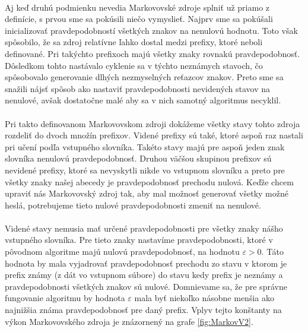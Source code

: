 \paragraph{}
Aj keď druhú podmienku nevedia Markovovské zdroje splniť už priamo z definície, s prvou sme sa pokúsili niečo vymyslieť. Najprv sme sa pokúšali inicializovať pravdepodobností všetkých znakov na nenulovú hodnotu. Toto však spôsobilo, že sa zdroj relatívne ľahko dostal medzi prefixy, ktoré neboli definované. Pri takýchto prefixoch majú všetky znaky rovnakú pravdepodobnosť. Dôsledkom tohto nastávalo cyklenie sa v týchto neznámych stavoch, čo spôsobovalo generovanie dlhých nezmyselných reťazcov znakov. Preto sme sa snažili nájsť spôsob ako nastaviť pravdepodobnosti nevidených stavov na nenulové, avšak dostatočne malé aby sa v nich samotný algoritmus necyklil.

\paragraph{}
Pri takto definovanom Markovovskom zdroji dokážeme všetky stavy tohto zdroja rozdeliť do dvoch množín prefixov. Videné prefixy sú také, ktoré aspoň raz nastali pri učení podľa vstupného slovníka. Takéto stavy majú pre aspoň jeden znak slovníka nenulovú pravdepodobnosť. Druhou väčšou skupinou prefixov sú nevidené prefixy, ktoré sa nevyskytli nikde vo vstupnom slovníku a preto pre všetky znaky našej abecedy je pravdepodobnosť prechodu nulová. Keďže chcem upraviť nás Markovovský zdroj tak, aby mal možnosť generovať všetky možné heslá, potrebujeme tieto nulové pravdepodobnosti zmeniť na nenulové. 

\paragraph{}
Videné stavy nemusia mať určené pravdepodobnosti pre všetky znaky nášho vstupného slovníka. Pre tieto znaky nastavíme pravdepodobnosti, ktoré v pôvodnom algoritme majú nulovú pravdepodobnosť, na hodnotu \(\varepsilon > 0\). Táto hodnota by mala vyjadrovať pravdepodobnosť prechodu zo stavu v ktorom je prefix známy (z dát vo vstupnom súbore) do stavu kedy prefix je neznámy a pravdepodobnosti všetkých znakov sú nulové. Domnievame sa, že pre správne fungovanie algoritmu by hodnota \(\varepsilon\) mala byť niekoľko násobne menšia ako najnižšia známa pravdepodobnosť pre daný prefix. Vplyv tejto konštanty na výkon Markovovského zdroja je znázornený na grafe \ref{fig:MarkovV2}.

